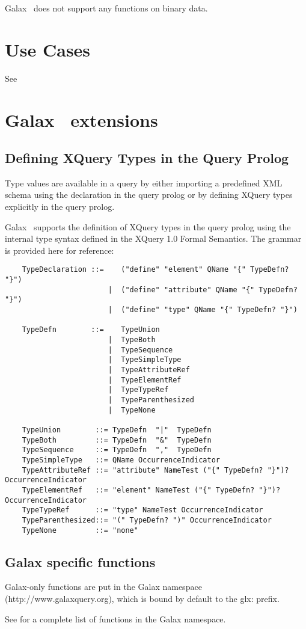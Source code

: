  Galax \galaxversion\ does not support any functions on binary data.


\section{Use Cases}

  See 

\section{Galax \galaxversion\ extensions}

\subsection{Defining XQuery Types in the Query Prolog}

    Type values are available in a query by either importing a
    predefined XML schema using the  declaration in the
    query prolog or by defining XQuery types explicitly in the query prolog.

    Galax \galaxversion\ supports the definition of XQuery types in the query
    prolog using the internal type syntax defined in the XQuery 1.0
    Formal Semantics.  The grammar is provided here for reference:

\begin{verbatim}
    TypeDeclaration ::=    ("define" "element" QName "{" TypeDefn? "}")
                        |  ("define" "attribute" QName "{" TypeDefn? "}")
                        |  ("define" "type" QName "{" TypeDefn? "}")

    TypeDefn        ::=    TypeUnion 
                        |  TypeBoth 
                        |  TypeSequence 
                        |  TypeSimpleType 
                        |  TypeAttributeRef 
                        |  TypeElementRef 
                        |  TypeTypeRef 
                        |  TypeParenthesized 
                        |  TypeNone

    TypeUnion        ::= TypeDefn  "|"  TypeDefn
    TypeBoth         ::= TypeDefn  "&"  TypeDefn
    TypeSequence     ::= TypeDefn  ","  TypeDefn
    TypeSimpleType   ::= QName OccurrenceIndicator
    TypeAttributeRef ::= "attribute" NameTest ("{" TypeDefn? "}")? OccurrenceIndicator
    TypeElementRef   ::= "element" NameTest ("{" TypeDefn? "}")? OccurrenceIndicator
    TypeTypeRef      ::= "type" NameTest OccurrenceIndicator
    TypeParenthesized::= "(" TypeDefn? ")" OccurrenceIndicator
    TypeNone         ::= "none"
\end{verbatim}

\subsection{Galax specific functions}

    Galax-only functions are put in the Galax namespace
    (http://www.galaxquery.org), which is bound by default to the
    glx: prefix.

    See  for a complete list of functions
    in the Galax namespace.


